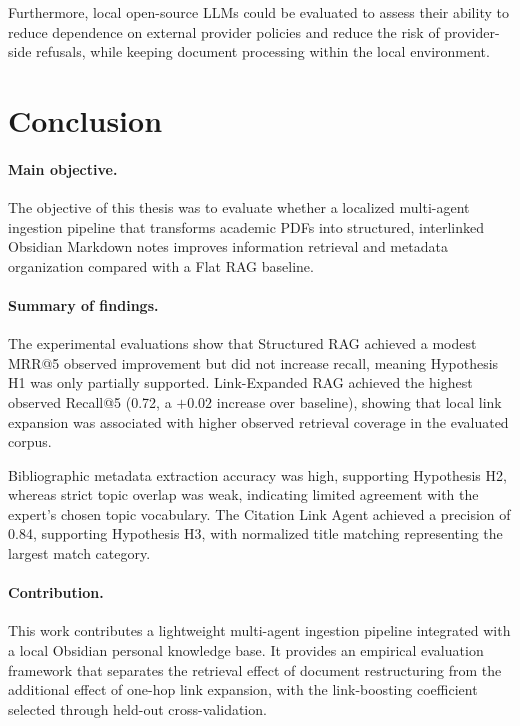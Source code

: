 \documentclass[runningheads]{llncs}
\begin{document}
Furthermore, local open-source LLMs could be evaluated to assess their ability to reduce dependence on external provider policies and reduce the risk of provider-side refusals, while keeping document processing within the local environment.

\section{Conclusion}
\label{sec:conclusion}

\paragraph{Main objective.}
The objective of this thesis was to evaluate whether a localized multi-agent ingestion pipeline that transforms academic PDFs into structured, interlinked Obsidian Markdown notes improves information retrieval and metadata organization compared with a Flat RAG baseline.

\paragraph{Summary of findings.}
The experimental evaluations show that Structured RAG achieved a modest MRR@5 observed improvement but did not increase recall, meaning Hypothesis H1 was only partially supported. Link-Expanded RAG achieved the highest observed Recall@5 (0.72, a $+0.02$ increase over baseline), showing that local link expansion was associated with higher observed retrieval coverage in the evaluated corpus. 

Bibliographic metadata extraction accuracy was high, supporting Hypothesis H2, whereas strict topic overlap was weak, indicating limited agreement with the expert’s chosen topic vocabulary. The Citation Link Agent achieved a precision of 0.84, supporting Hypothesis H3, with normalized title matching representing the largest match category.

\paragraph{Contribution.}
This work contributes a lightweight multi-agent ingestion pipeline
integrated with a local Obsidian personal knowledge base. It provides
an empirical evaluation framework that separates the retrieval effect
of document restructuring from the additional effect of one-hop link
expansion, with the link-boosting coefficient selected through
held-out cross-validation.
\end{document}
